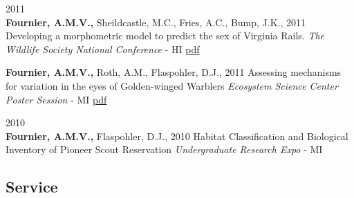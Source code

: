 \documentclass[]{article}
\begin{document}
2011\\
\textbf{Fournier, A.M.V.,} Sheildcastle, M.C., Fries, A.C., Bump, J.K.,
2011 Developing a morphometric model to predict the sex of Virginia
Rails. \emph{The Wildlife Society National Conference} - HI
\href{http://figshare.com/articles/Developing_a_Morphometric_Model_to_Predict_the_Sex_of_Virginia_Rails/1320946}{pdf}

\textbf{Fournier, A.M.V.,} Roth, A.M., Flaspohler, D.J., 2011 Assessing
mechanisms for variation in the eyes of Golden-winged Warblers
\emph{Ecosystem Science Center Poster Session} - MI
\href{http://figshare.com/articles/What_can_their_eyes_tell_us_Assessing_the_relationship_between_eye_spotting_age_and_breeding_location_of_Golden_winged_Warblers/1320945}{pdf}

2010\\
\textbf{Fournier, A.M.V.,} Flaspohler, D.J., 2010 Habitat Classification
and Biological Inventory of Pioneer Scout Reservation
\emph{Undergraduate Research Expo} - MI

\subsection{Service}\label{service}
\end{document}
